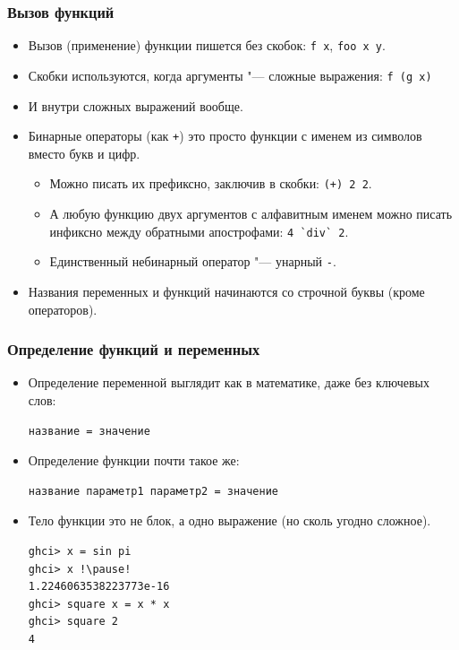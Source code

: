 \documentclass[10pt]{beamer}
\begin{document}
\begin{frame}[fragile]
  \frametitle{Вызов функций}
  \begin{itemize}
    \item Вызов (применение) функции пишется без скобок: \lstinline|f x|, \lstinline|foo x y|.
    \item Скобки используются, когда аргументы "--- сложные выражения: \lstinline|f (g x)|
    \item И внутри сложных выражений вообще.
    \item Бинарные операторы (как \lstinline|+|) это просто функции с именем из символов вместо букв и цифр.
          \begin{itemize}
            \item Можно писать их префиксно, заключив в скобки: \lstinline[breaklines=false]|(+) 2 2|.
            \item А любую функцию двух аргументов с алфавитным именем можно писать инфиксно между обратными апострофами:
                  \lstinline|4 `div` 2|.
            \item Единственный небинарный оператор "--- унарный \lstinline|-|.
          \end{itemize}
    \item Названия переменных и функций начинаются со строчной буквы (кроме операторов).
  \end{itemize}
\end{frame}

\begin{frame}[fragile]
  \frametitle{Определение функций и переменных}
  \begin{itemize}
    \item Определение переменной выглядит как в математике, даже без ключевых слов:
          \begin{lstlisting}
название = значение
\end{lstlisting}
    \item Определение функции почти такое же:
          \begin{lstlisting}
название параметр1 параметр2 = значение
\end{lstlisting}
    \item Тело функции это не блок, а одно выражение (но сколь угодно сложное).
          \begin{lstlisting}
ghci> x = sin pi
ghci> x !\pause!
1.2246063538223773e-16
ghci> square x = x * x
ghci> square 2
4
\end{lstlisting}
  \end{itemize}
\end{frame}
\end{document}
